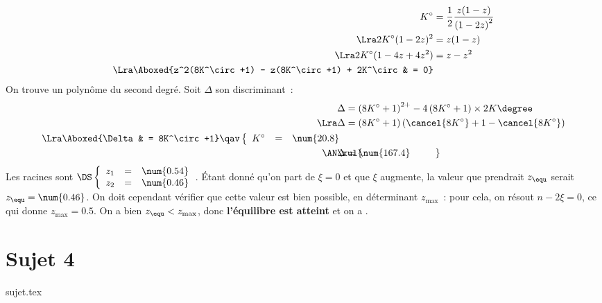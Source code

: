 \documentclass[a4paper, 11pt]{book}
\begin{document}
{\begin{align*}
		K^\circ                                              & = \frac{1}{2} \frac{z(1-z)}{\left( 1 - 2z \right)^2}
		\\\Lra
		2K^\circ(1-2z)^2                                     & = z(1-z)
		\\\Lra
		2K^\circ(1-4z + 4z^2)                                & = z - z^2
		\\\Lra
		\Aboxed{z^2(8K^\circ +1) - z(8K^\circ +1) + 2K^\circ & = 0}
	\end{align*}
	On trouve un polynôme du second degré. Soit $\Delta$ son discriminant~:
	\begin{align*}
		\Delta         & = \left( 8K^\circ+1 \right)^{2+} -
		4\left(8K^\circ+1\right)\times 2K\degree
		\\\Lra
		\Delta         & = \left( 8K^\circ+1 \right)\left(
		\cancel{8K^\circ}+1-\cancel{8K^\circ} \right)
		\\\Lra
		\Aboxed{\Delta & = 8K^\circ+1}
		\qav
		\left\{
		\begin{array}{rcl}
			K^\circ & = & \num{20.8}
		\end{array}
		\right.                                             \\
		\makebox[0pt][l]{$\phantom{\AN}\xul{\phantom{\Delta = \num{167.4}}}$}
		\AN
		\Delta         & = \num{167.4}
	\end{align*}
	Les racines sont
	$\DS\left\{
		\begin{array}{rcl}
			z_1 & = & \num{0.54} \\
			z_2 & = & \num{0.46}
		\end{array}
		\right.$.
	\bigbreak
	Étant donné qu'on part de $\xi = 0$ et que $\xi$ augmente, la valeur que
	prendrait $z_{\equ}$ serait $z_{\equ} = \num{0.46}$. On doit cependant
	vérifier que cette valeur est bien possible, en déterminant $z_{\max}$~:
	pour cela, on résout $n-2\xi = 0$, ce qui donne $z_{\max} = \num{0.5}$.
	On a bien $z_{\equ} < z_{\max}$, donc \textbf{l'équilibre est atteint} et
	on a .
}

\chapter{Sujet 4}

\resetQ
{sujet.tex}
\end{document}
